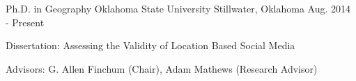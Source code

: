 

\begin{cventries}

  \cventry
    {Ph.D. in Geography} %
    {Oklahoma State University} %
    {Stillwater, Oklahoma} %
    {Aug. 2014 - Present} %
    {
      \begin{cvitems} %
        \item {Dissertation: Assessing the Validity of Location Based Social Media}
        \item {Advisors: G. Allen Finchum (Chair), Adam Mathews (Research Advisor)}
      \end{cvitems}
    }

\end{cventries}
